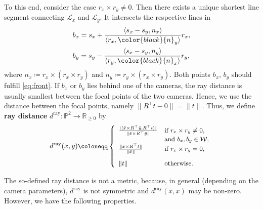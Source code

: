 \documentclass[10pt, twocolumn]{article}
\theoremstyle{definition}
\newcommand{\R}{{\ensuremath{\mathbb{R}}}}
\begin{document}
To this end, consider the case  $r_x\times r_y\neq0$. 
Then there exists a unique shortest line segment connecting $\mathcal L_x$ and $\mathcal L_y$. It intersects the respective lines in 
\begin{align}
\label{eq:closest_points}
&b_x = s_x + \frac{\langle s_x - s_y, {n}_x\rangle}{\langle {r}_x, {\color{black}{n}_y}\rangle} {r}_x,\\
&b_y = s_y -\frac{\langle s_x - s_y, {n}_y\rangle}{\langle {r}_y, {\color{black}{n}_x}\rangle} {r}_y, 
\end{align} 
where $n_x \coloneqq r_x \times(r_x\times r_y)$ and
$n_y \coloneqq r_y \times(r_x\times r_y)$.
Both points $b_x$, $b_y$ should fulfill \eqref{eq:front}.
If $b_x$ or $b_y$ lies behind one of the cameras, the ray distance is usually smallest between the focal points of the two cameras.
Hence, we use the distance between the focal points, namely
$\|R^\top t-0\| = \| t \|$.
Thus, we define \textbf{ray distance}
$d^\mathrm{ray}: \mathbb P^2 \to \R_{\ge 0}$ 
by
\begin{equation} \label{eq:line_corrected_distance}
\small
d^\mathrm{ray}(x,y)
\coloneqq
\left\{
\begin{array}{ll}
\frac{|\langle \tilde x \times R^\top \tilde y, R^\top t \rangle|}{\|\tilde x \times R^\top \tilde y\|}
& \text{if } r_x\times r_y \neq 0,\, 
\\
&
\text{and } b_x,b_y \in \mathcal W,
\\
\frac{\|\tilde x \times R^\top t\|}{\|\tilde x\|} & \text{if } r_x\times r_y = 0, \\[10pt]
\| t \| & \text{otherwise}.
\end{array}
\right.
\end{equation}

The so-defined ray distance is not a metric, 
because, in general (depending on the camera parameters), 
$d^\mathrm{ray}$ is not symmetric and $d^\mathrm{ray}(x,x)$ may be non-zero.
However, we have the following properties.
\end{document}
